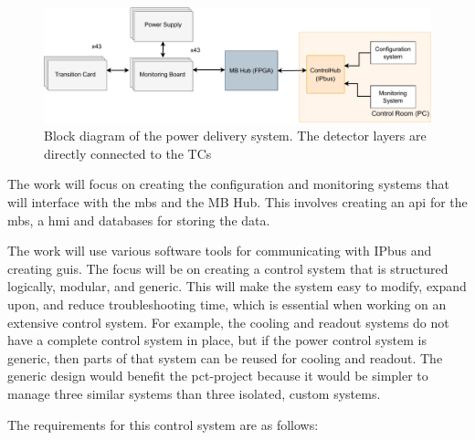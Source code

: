 \documentclass[main.tex]{subfiles}
\begin{document}
\begin{figure}[!htpb]
    \centering
    \includegraphics[scale = 0.65]{images/PCS basic overview.pdf}
    \caption{Block diagram of the power delivery system. The detector layers are directly connected to the TCs}
    \label{fig: pcs_basic}
\end{figure}
\FloatBarrier

The work will focus on creating the configuration and monitoring systems that will interface with the \gls{mb}s and the MB Hub. This involves creating an \gls{api} for the \gls{mb}s, a \gls{hmi} and databases for storing the data.

The work will use various software tools for communicating with IPbus and creating \gls{gui}s. The focus will be on creating a control system that is structured logically, modular, and generic. This will make the system easy to modify, expand upon, and reduce troubleshooting time, which is essential when working on an extensive control system. For example, the cooling and readout systems do not have a complete control system in place, but if the power control system is generic, then parts of that system can be reused for cooling and readout. The generic design would benefit the \gls{pct}-project because it would be simpler to manage three similar systems than three isolated, custom systems.


The requirements for this control system are as follows:
\end{document}
